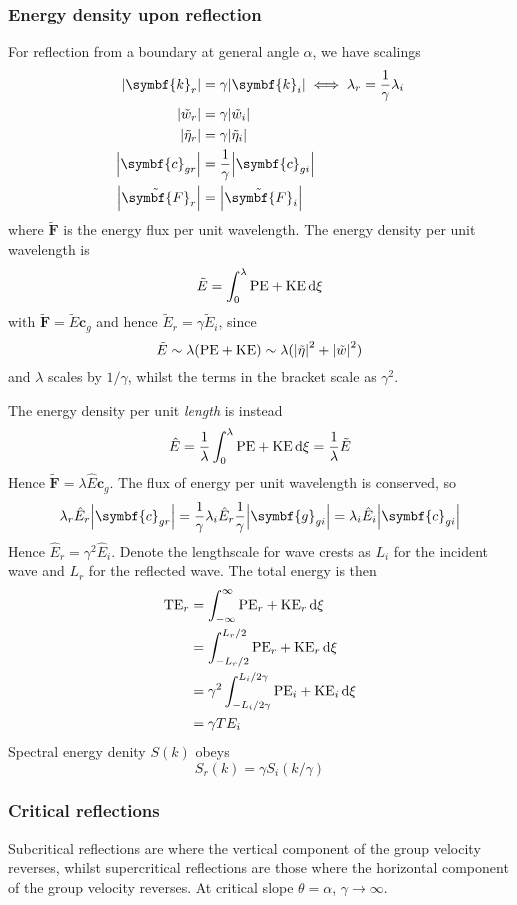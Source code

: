 \documentclass{jknotes}
\begin{document}
\subsubsection{Energy density upon reflection}
For reflection from a boundary at general angle $\alpha$, we have scalings
\begin{align}
	\abs{\symbf{k}_r} &= \gamma \abs{\symbf{k}_i} \iff \lambda_r =
		\frac{1}{\gamma} \lambda_i \\
	\abs{\tilde{w}_r} &= \gamma \abs{\tilde{w}_i} \\
	\abs{\tilde{\eta}_r} &= \gamma \abs{\tilde{\eta}_i} \\
	\abs{\symbf{c}_{gr}} &= \frac{1}{\gamma} \abs{\symbf{c}_{gi}}\\
	\abs{\tilde{\symbf{F}}_r} &= \abs{\tilde{\symbf{F}}_i}
\end{align}
where $\tilde{\symbf{F}}$ is the energy flux per unit wavelength. The energy
density per unit wavelength is
\begin{equation}
	\tilde{E} = \int_0^\lambda \text{PE} + \text{KE} \, \diffd \xi
\end{equation}
with $\tilde{\symbf{F}} = \tilde{E} \symbf{c}_g$ and hence $\tilde{E}_r =
\gamma \tilde{E}_i$, since
\begin{equation}
	\tilde{E} \sim \lambda (\text{PE} + \text{KE}) \sim \lambda
	(\abs{\tilde{\eta}}^2 + \abs{\tilde{w}}^2)
\end{equation}
and $\lambda$ scales by $1/\gamma$, whilst the terms in the bracket scale as
$\gamma^2$. 

The energy density per unit \emph{length} is instead
\begin{equation}
	\hat{E} = \frac{1}{\lambda} \int_0^\lambda \text{PE} + \text{KE} \, \diffd
	\xi = \frac{1}{\lambda} \tilde{E}
\end{equation}
Hence $\tilde{\symbf{F}} = \lambda \hat{E} \symbf{c}_g$. The flux of energy
per unit wavelength is conserved, so
\begin{equation}
	\lambda_r \hat{E}_r \abs{\symbf{c}_{gr}} = \frac{1}{\gamma} \lambda_i
	\hat{E}_r \frac{1}{\gamma} \abs{\symbf{g}_{gi}} = \lambda_i \hat{E}_i
	\abs{\symbf{c}_{gi}}
\end{equation}
Hence $\hat{E}_r = \gamma^2 \hat{E}_i$. Denote the lengthscale for wave crests
as $L_i$ for the incident wave and $L_r$ for the reflected wave. The total
energy is then
\begin{align}
	\text{TE}_r &= \int_{-\infty}^\infty \text{PE}_r + \text{KE}_r \, \diffd
	\xi \\
				&= \int_{-L_r/2}^{L_r/2} \text{PE}_r + \text{KE}_r \, \diffd
				\xi \\
				&= \gamma^2 \int_{-L_i/2\gamma}^{L_i/2\gamma}
				\text{PE}_i+\text{KE}_i \, \diffd \xi \\
				&= \gamma T E_i
\end{align}
Spectral energy denity $S(k)$ obeys
\begin{equation}
	S_r(k) = \gamma S_i(k/\gamma)
\end{equation}

\subsubsection{Critical reflections}
Subcritical reflections are where the vertical component of the group velocity
reverses, whilst supercritical reflections are those where the horizontal
component of the group velocity reverses. At critical slope $\theta = \alpha$,
$\gamma \to \infty$.
\end{document}
